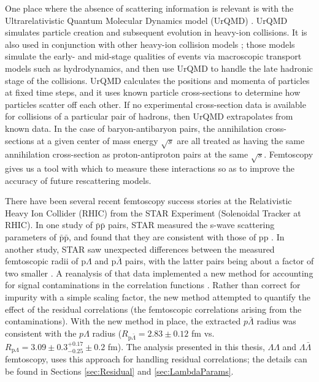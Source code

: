 One place where the absence of scattering information is relevant is with the Ultrarelativistic Quantum Molecular Dynamics model (UrQMD) \cite{Bleicher:1999xi}. UrQMD simulates particle creation and subsequent evolution in heavy-ion collisions.
It is also used in conjunction with other heavy-ion collision models \cite{Bass:2000ib,Ryu:2012at,Song:2013qma}; those models simulate the early- and mid-stage qualities of events via macroscopic transport models such as hydrodynamics, and then use UrQMD to handle the late hadronic stage of the collisions.
UrQMD calculates the positions and momenta of particles at fixed time steps, and it uses known particle cross-sections to determine how particles scatter off each other.
If no experimental cross-section data is available for collisions of a particular pair of hadrons, then UrQMD extrapolates from known data.
In the case of baryon-antibaryon pairs, the annihilation cross-sections at a given center of mass energy $\sqrt{s}$ are all treated as having the same annihilation cross-section as proton-antiproton pairs at the same $\sqrt{s}$.
Femtoscopy gives us a tool with which to measure these interactions so as to improve the accuracy of future rescattering models.

There have been several recent femtoscopy success stories at the Relativistic Heavy Ion Collider (RHIC) from the STAR Experiment (Solenoidal Tracker at RHIC).
In one study of $\bar{\mathrm{p}}\bar{\mathrm{p}}$ pairs, STAR measured the s-wave scattering parameters of $\bar{\mathrm{p}}\bar{\mathrm{p}}$, and found that they are consistent with those of pp \cite{Adamczyk:2015hza}.
In another study, STAR saw unexpected differences between the measured femtoscopic radii of p$\Lambda$ and p$\bar{\Lambda}$ pairs, with the latter pairs being about a factor of two smaller \cite{Adams:2005ws}.
A reanalysis of that data implemented a new method for accounting for signal contaminations in the correlation functions \cite{Kisiel:2014mma}.
Rather than correct for impurity with a simple scaling factor, the new method attempted to quantify the effect of the residual correlations (the femtoscopic correlations arising from the contaminations).
With the new method in place, the extracted $p\bar{\Lambda}$ radius was consistent with the $p\Lambda$ radius ($R_{\mathrm{p}\bar{\Lambda}} = 2.83 \pm 0.12$ fm vs.\ $R_{\mathrm{p}\Lambda} = 3.09 \pm 0.3^{+0.17}_{-0.25} \pm 0.2$ fm).
The analysis presented in this thesis, $\Lambda\Lambda$ and $\Lambda\bar{\Lambda}$ femtoscopy, uses this approach for handling residual correlations; the details can be found in Sections \ref{sec:Residual} and \ref{sec:LambdaParams}.


